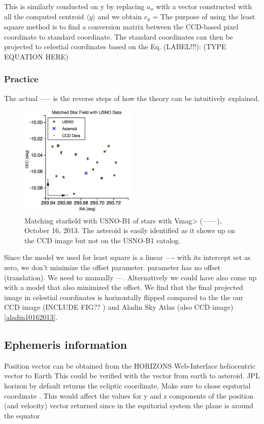 \documentclass[authoryear, 12pt,5p, times]{elsarticle}
\begin{document}
	This is similarly conducted on y by replacing \textbf{$a_x$} with a vector constructed with all the computed centroid $\langle y \rangle$ and we obtain \textbf{$c_y$} =
	The purpose of using the least square method is to find a conversion matrix between the CCD-based pixel coordinate to standard coordinate. 
	The standard coordinates can then be projected to celestial coordinates based on the Eq. (LABEL!!!):
	(TYPE EQUATION HERE)

	\subsubsection{Practice}
	The actual ----- is the reverse steps of how the theory can be intuitively explained.

	
	\begin{figure}[h!]
\includegraphics[width=0.5\textwidth]{figures/starfield_match}
\caption{ Matching starfield with USNO-B1 of stars with Vmag>  (------), October 16, 2013. The asteroid is easily identified as it shows up on the CCD image but not on the USNO-B1 catalog.}
\label{starfield_match}
\end{figure}
Since the model we used for least square is a linear ---- with its intercept set as zero, we don't minimize the offset parameter. parameter has no offset (translation). We need to manually ---. Alternatively we could have also come up with a model that also minimized the offset. 
We find that the final projected image in celestial coordinates is horizontally flipped compared to the the our CCD image (INCLUDE FIG?? ) and  Aladin Sky Atlas (also CCD image) \ref{aladin10162013}.
	\subsection{Ephemeris information}	
Position vector can be obtained from the HORIZONS Web-Interface 
heliocentric vector to Earth
This could be verified with the vector from earth to asteroid.
	JPL horizon by default returns the ecliptic coordinate, Make sure to chose equtorial coordinate . This would affect the values for y and z components of the position (and velocity) vector returned since in the equitorial system the plane is around the equator
	
\end{document}
